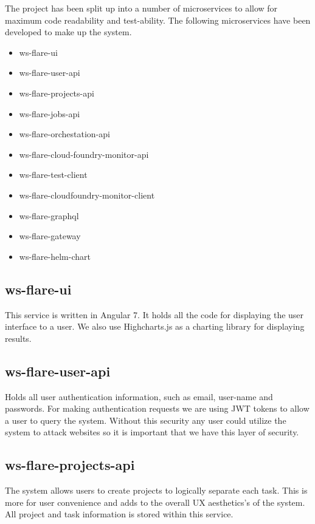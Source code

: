 The project has been split up into a number of microservices to allow for maximum code readability and test-ability. The following microservices have been developed to make up the system.

\begin{itemize}
  \item ws-flare-ui
  \item ws-flare-user-api
  \item ws-flare-projects-api
  \item ws-flare-jobs-api
  \item ws-flare-orchestation-api
  \item ws-flare-cloud-foundry-monitor-api
  \item ws-flare-test-client
  \item ws-flare-cloudfoundry-monitor-client
  \item ws-flare-graphql
  \item ws-flare-gateway
  \item ws-flare-helm-chart
\end{itemize}

\subsection{ws-flare-ui}

This service is written in Angular 7. It holds all the code for displaying the user interface to a user. We also use Highcharts.js as a charting library for displaying results.

\subsection{ws-flare-user-api}

Holds all user authentication information, such as email, user-name and passwords. For making authentication requests we are using JWT tokens to allow a user to query the system. Without this security any user could utilize the system to attack websites so it is important that we have this layer of security.

\subsection{ws-flare-projects-api}

The system allows users to create projects to logically separate each task. This is more for user convenience and adds to the overall UX aesthetics's of the system. All project and task information is stored within this service. 

